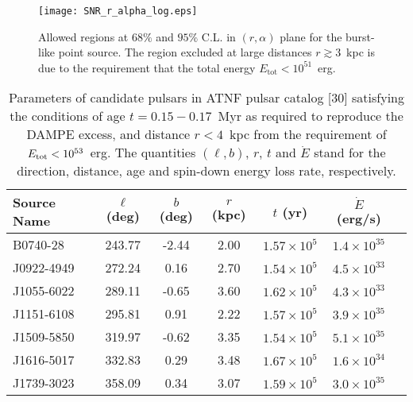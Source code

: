 \begin{figure}[htb]
	\centering
	\texttt{[image: SNR\_r\_alpha\_log.eps]}	
	\caption{
	 Allowed regions at $68\%$ and $95\%$ C.L. in $(r, \alpha)$ plane for the burst-like point source.
	 The region excluded at large distances    $r\gtrsim 3$~kpc is due to the requirement that 
	 the total energy $E_{\text{tot}} <10^{51}$~erg.
	}\label{fig:r-alpha-dependenc}
\end{figure}


\begin{table}[htbp]
	\centering
		\begin{tabular}{l|cc|cccc} 
		\hline\hline
		  Source Name & $\ell$(deg) &  $b$(deg) & $r$ (kpc) & $t$ (yr) & $\dot{E}$ (erg/s)  \\
		\hline
		B0740-28 & 243.77 & -2.44 & 2.00  & $1.57\times10^{5}$ & $1.4\times10^{35}$  \\
		J0922-4949 & 272.24 & 0.16 &  2.70  & $1.54\times10^{5}$ & $4.5\times10^{33}$  \\
		J1055-6022 & 289.11 & -0.65 & 3.60 & $1.62\times10^{5}$ & $4.3\times10^{33}$  \\
		J1151-6108 & 295.81 & 0.91  & 2.22  & $1.57\times10^{5}$ & $3.9\times10^{35}$  \\
		J1509-5850 & 319.97 & -0.62 & 3.35 & $1.54\times10^{5}$ & $5.1\times10^{35}$  \\
		J1616-5017 & 332.83 & 0.29 & 3.48  & $1.67\times10^{5}$ & $1.6\times10^{34}$ \\
		J1739-3023 & 358.09 & 0.34 & 3.07 & $1.59\times10^{5}$ & $3.0\times10^{35}$ \\
				\hline\hline
	 \end{tabular}%
	 \caption{
	 	Parameters 
		of candidate pulsars  in ATNF pulsar catalog [30] %
		satisfying the conditions of 
		 age $t=0.15-0.17$~Myr  as required to reproduce 
		 the DAMPE excess, and distance $r<4$~kpc from the requirement of $E_{\text{tot}}<10^{53}$~erg.
		The quantities  $(\ell,b)$, $r$, $t$ and $\dot{E}$ stand for the 
		 direction, distance, age and spin-down energy loss rate, respectively.
	 }
	\label{tab:ATNF}%
\end{table}%


\newpage
